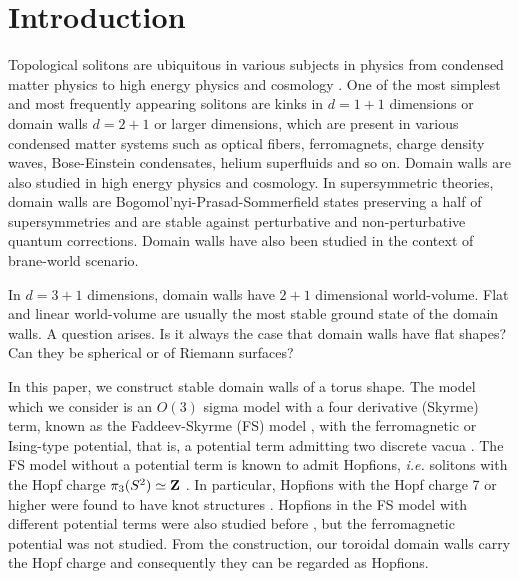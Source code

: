 \documentclass[aps,prd,preprint,
superscriptaddress]{revtex4}
\newcommand {\1}[1]{\frac{1}{#1}}
\newcommand {\2}[1]{\frac{i}{#1}}
\begin{document}
\maketitle



\section{Introduction}

Topological solitons are ubiquitous in various subjects in physics from condensed matter physics \cite{Volovik2003} to high energy physics \cite{Manton:2004tk} and cosmology \cite{Vilenkin:2000}. One of the most simplest and most frequently appearing solitons are kinks in $d=1+1$ dimensions 
or domain walls $d=2+1$ or larger dimensions, 
which are present in various 
condensed matter systems such as
optical fibers, ferromagnets, charge density waves,  Bose-Einstein condensates, helium superfluids and so on.  
Domain walls are also studied in high energy physics 
and cosmology. 
In supersymmetric theories,
domain walls are Bogomol'nyi-Prasad-Sommerfield states
preserving a half of supersymmetries 
and are stable against perturbative and non-perturbative quantum corrections. 
Domain walls have also been studied in the context of brane-world scenario.

In $d=3+1$ dimensions, domain walls have $2+1$ dimensional world-volume.
Flat and linear world-volume are usually the most stable ground state of the domain walls. A question arises. 
Is it always the case that domain walls have flat shapes? 
Can they be spherical or of Riemann surfaces? 

In this paper, we construct stable domain walls of 
a torus shape. 
The model which we consider is an $O(3)$ sigma model 
with a four derivative (Skyrme) term, 
known as the Faddeev-Skyrme (FS) model 
\cite{Faddeev:1975,Faddeev:1996zj}, 
with 
the ferromagnetic or Ising-type potential, that is,  
a potential term admitting two discrete vacua
\cite{Nitta:2012kk}. 
The FS model without a potential term 
is known to admit Hopfions, {\it i.e.} solitons 
with the Hopf charge $\pi_3(S^2) \simeq {\bf Z}$  
\cite{Gladikowski:1996mb,Faddeev:1996zj,Battye:1998pe,
Hietarinta:2000ci,Sutcliffe:2007ui,Radu:2008pp}.
In particular, Hopfions with the Hopf charge 7 or 
higher were found to have knot structures  
\cite{Battye:1998pe,Hietarinta:2000ci,Sutcliffe:2007ui}.
Hopfions in the FS model with different 
potential terms were also studied before  
\cite{Foster:2010zb,Harland:2013uk,Battye:2013xf}, 
but the ferromagnetic potential was not studied. 
From the construction, our toroidal domain walls carry the Hopf charge 
\cite{deVega:1977rk,Gladikowski:1996mb} 
and consequently they can be regarded as Hopfions.
\end{document}
